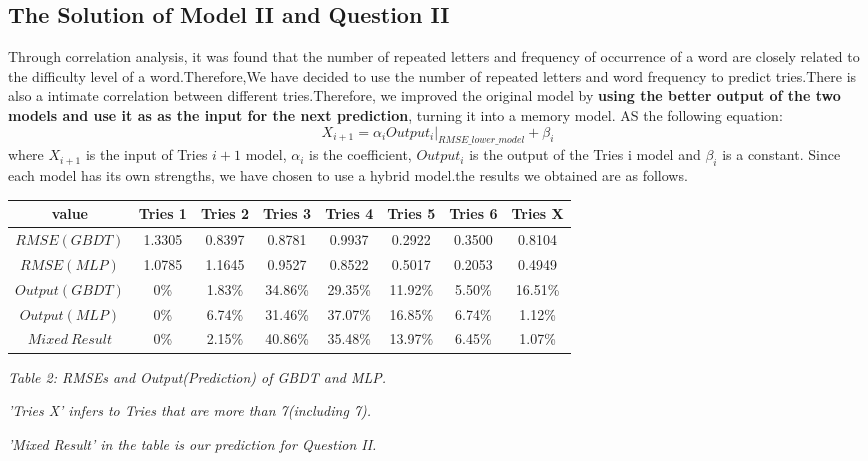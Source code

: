 \documentclass[12pt]{article}
\begin{document}
\subsection{The Solution of Model II and Question II}
Through correlation analysis, it was found that the number of repeated letters and frequency of occurrence of a word are closely related to the difficulty level of a word.Therefore,We have decided to use the number of repeated letters and word frequency to predict tries.There is also a intimate correlation between different tries.Therefore, we improved the original model by \textbf{using the better output of the two models and use it as as the input for the next prediction}, turning it into a memory model. AS the following equation:
\begin{equation*}
	X_{i+1} = \alpha_i Output_{i}|_{RMSE\_lower\_model} + \beta_i
\end{equation*}
where $X_{i+1}$ is the input of Tries $i+1$ model, $ \alpha_i$ is the coefficient, $Output_{i}$ is the output of the Tries i model and $\beta_i$ is a constant.
Since each model has its own strengths, we have chosen to use a hybrid model.the results we obtained are as follows.
\vspace{0.2cm}
\begin{center}
\begin{tabular}{c c c c c c c c}
\hline
value & Tries 1 & Tries 2 & Tries 3 & Tries 4& Tries 5& Tries 6& Tries X \\
\hline
$RMSE(GBDT)$&1.3305&0.8397&0.8781&0.9937&0.2922&0.3500&0.8104\\
$RMSE(MLP)$&1.0785&1.1645&0.9527&0.8522&0.5017&0.2053&0.4949\\
\hline
$Output(GBDT)$&0\%&1.83\%&34.86\%&29.35\%&11.92\%&5.50\%&16.51\%\\
$Output(MLP)$&0\%&6.74\%&31.46\%&37.07\%&16.85\%&6.74\%&1.12\%\\
\hline
$Mixed\ Result$&0\%&2.15\%&40.86\%&35.48\%&13.97\%&6.45\%&1.07\%\\
\hline
\end{tabular}
\vspace{0.2cm}

\textit{Table 2: RMSEs and Output(Prediction) of GBDT and MLP.}

\textit{'Tries X' infers to Tries that are more than 7(including 7).}

\textit{'Mixed Result' in the table is our prediction for Question II.}
\end{center}
\end{document}
